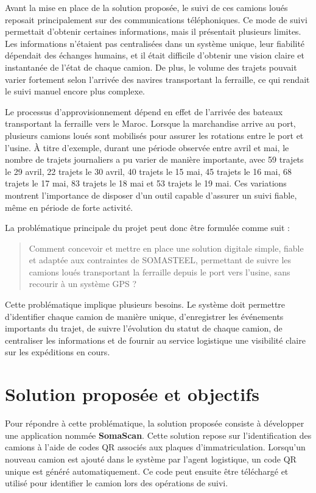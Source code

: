 Avant la mise en place de la solution proposée, le suivi de ces camions loués reposait principalement sur des communications téléphoniques. Ce mode de suivi permettait d'obtenir certaines informations, mais il présentait plusieurs limites. Les informations n'étaient pas centralisées dans un système unique, leur fiabilité dépendait des échanges humains, et il était difficile d'obtenir une vision claire et instantanée de l'état de chaque camion. De plus, le volume des trajets pouvait varier fortement selon l'arrivée des navires transportant la ferraille, ce qui rendait le suivi manuel encore plus complexe.

Le processus d'approvisionnement dépend en effet de l'arrivée des bateaux transportant la ferraille vers le Maroc. Lorsque la marchandise arrive au port, plusieurs camions loués sont mobilisés pour assurer les rotations entre le port et l'usine. À titre d'exemple, durant une période observée entre avril et mai, le nombre de trajets journaliers a pu varier de manière importante, avec 59 trajets le 29 avril, 22 trajets le 30 avril, 40 trajets le 15 mai, 45 trajets le 16 mai, 68 trajets le 17 mai, 83 trajets le 18 mai et 53 trajets le 19 mai. Ces variations montrent l'importance de disposer d'un outil capable d'assurer un suivi fiable, même en période de forte activité.

La problématique principale du projet peut donc être formulée comme suit :

\begin{quote}
Comment concevoir et mettre en place une solution digitale simple, fiable et adaptée aux contraintes de SOMASTEEL, permettant de suivre les camions loués transportant la ferraille depuis le port vers l'usine, sans recourir à un système GPS ?
\end{quote}

Cette problématique implique plusieurs besoins. Le système doit permettre d'identifier chaque camion de manière unique, d'enregistrer les événements importants du trajet, de suivre l'évolution du statut de chaque camion, de centraliser les informations et de fournir au service logistique une visibilité claire sur les expéditions en cours.

\section{Solution proposée et objectifs}

Pour répondre à cette problématique, la solution proposée consiste à développer une application nommée \textbf{SomaScan}. Cette solution repose sur l'identification des camions à l'aide de codes QR associés aux plaques d'immatriculation. Lorsqu'un nouveau camion est ajouté dans le système par l'agent logistique, un code QR unique est généré automatiquement. Ce code peut ensuite être téléchargé et utilisé pour identifier le camion lors des opérations de suivi.

